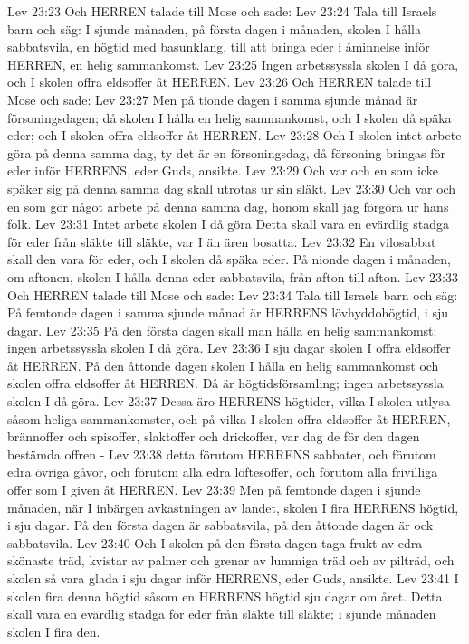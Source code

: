 Lev 23:23  Och HERREN talade till Mose och sade:
Lev 23:24  Tala till Israels barn och säg: I sjunde månaden, på första dagen i månaden, skolen I hålla sabbatsvila, en högtid med basunklang, till att bringa eder i åminnelse inför HERREN, en helig sammankomst.
Lev 23:25  Ingen arbetssyssla skolen I då göra, och I skolen offra eldsoffer åt HERREN.
Lev 23:26  Och HERREN talade till Mose och sade:
Lev 23:27  Men på tionde dagen i samma sjunde månad är försoningsdagen; då skolen I hålla en helig sammankomst, och I skolen då späka eder; och I skolen offra eldsoffer åt HERREN.
Lev 23:28  Och I skolen intet arbete göra på denna samma dag, ty det är en försoningsdag, då försoning bringas för eder inför HERRENS, eder Guds, ansikte.
Lev 23:29  Och var och en som icke späker sig på denna samma dag skall utrotas ur sin släkt.
Lev 23:30  Och var och en som gör något arbete på denna samma dag, honom skall jag förgöra ur hans folk.
Lev 23:31  Intet arbete skolen I då göra Detta skall vara en evärdlig stadga för eder från släkte till släkte, var I än ären bosatta.
Lev 23:32  En vilosabbat skall den vara för eder, och I skolen då späka eder. På nionde dagen i månaden, om aftonen, skolen I hålla denna eder sabbatsvila, från afton till afton.
Lev 23:33  Och HERREN talade till Mose och sade:
Lev 23:34  Tala till Israels barn och säg: På femtonde dagen i samma sjunde månad är HERRENS lövhyddohögtid, i sju dagar.
Lev 23:35  På den första dagen skall man hålla en helig sammankomst; ingen arbetssyssla skolen I då göra.
Lev 23:36  I sju dagar skolen I offra eldsoffer åt HERREN. På den åttonde dagen skolen I hålla en helig sammankomst och skolen offra eldsoffer åt HERREN. Då är högtidsförsamling; ingen arbetssyssla skolen I då göra.
Lev 23:37  Dessa äro HERRENS högtider, vilka I skolen utlysa såsom heliga sammankomster, och på vilka I skolen offra eldsoffer åt HERREN, brännoffer och spisoffer, slaktoffer och drickoffer, var dag de för den dagen bestämda offren -
Lev 23:38  detta förutom HERRENS sabbater, och förutom edra övriga gåvor, och förutom alla edra löftesoffer, och förutom alla frivilliga offer som I given åt HERREN.
Lev 23:39  Men på femtonde dagen i sjunde månaden, när I inbärgen avkastningen av landet, skolen I fira HERRENS högtid, i sju dagar. På den första dagen är sabbatsvila, på den åttonde dagen är ock sabbatsvila.
Lev 23:40  Och I skolen på den första dagen taga frukt av edra skönaste träd, kvistar av palmer och grenar av lummiga träd och av pilträd, och skolen så vara glada i sju dagar inför HERRENS, eder Guds, ansikte.
Lev 23:41  I skolen fira denna högtid såsom en HERRENS högtid sju dagar om året. Detta skall vara en evärdlig stadga för eder från släkte till släkte; i sjunde månaden skolen I fira den.
